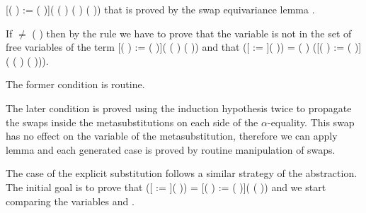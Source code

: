   [(   ) := (   )]( (   ) (   ) (   )) that is proved by the swap equivariance lemma .
\begin{coqdoccode}
\end{coqdoccode}
If  \ensuremath{\not=} (   ) then by the rule  we have to prove that the variable     is not in the set of free variables of the term [(   ) := (   )]( (   )  (   )) and that    ([ := ](   )) =
    (   ) ([(   ) := (   )]( (   )  (   ))).
\begin{coqdoccode}
\end{coqdoccode}
The former condition is routine.
\begin{coqdoccode}
\end{coqdoccode}
The later condition is proved using the induction hypothesis twice to propagate the swaps inside the metasubstitutions on each side of the $\alpha$-equality. This swap has no effect on the variable of the metasubstitution, therefore we can apply lemma  and each generated case is proved by routine manipulation of swaps.
\begin{coqdoccode}
\end{coqdoccode}
The case of the explicit substitution follows a similar strategy of the abstraction. The initial goal is to prove that    ([ := ](   )) = [(   ) := (   )](   (   )) and we start comparing the variables  and .
